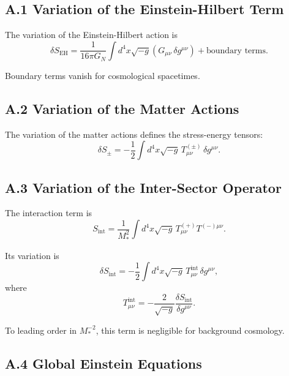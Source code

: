 \documentclass[11pt,a4paper]{article}
\begin{document}
\subsection*{A.1 Variation of the Einstein-Hilbert Term}

The variation of the Einstein-Hilbert action is
\begin{equation}
\delta S_{\mathrm{EH}} = \frac{1}{16\pi G_N} 
\int d^4x \sqrt{-g} \left( G_{\mu\nu} \, \delta g^{\mu\nu} \right)
+ \text{boundary terms}.
\end{equation}

Boundary terms vanish for cosmological spacetimes.

\subsection*{A.2 Variation of the Matter Actions}

The variation of the matter actions defines the stress-energy tensors:
\begin{equation}
\delta S_\pm = -\frac{1}{2} \int d^4x \sqrt{-g} \, 
T_{\mu\nu}^{(\pm)} \, \delta g^{\mu\nu}.
\end{equation}

\subsection*{A.3 Variation of the Inter-Sector Operator}

The interaction term is
\begin{equation}
S_{\mathrm{int}} = \frac{1}{M_*^2} 
\int d^4x \sqrt{-g} \, T^{(+)}_{\mu\nu} T^{(-)\mu\nu}.
\end{equation}

Its variation is
\begin{equation}
\delta S_{\mathrm{int}} = 
-\frac{1}{2} \int d^4x \sqrt{-g} \, 
T_{\mu\nu}^{\mathrm{int}} \, \delta g^{\mu\nu},
\end{equation}
where
\begin{equation}
T_{\mu\nu}^{\mathrm{int}} = 
-\frac{2}{\sqrt{-g}} \frac{\delta S_{\mathrm{int}}}{\delta g^{\mu\nu}}.
\end{equation}

To leading order in $M_*^{-2}$, this term is negligible for background cosmology.

\subsection*{A.4 Global Einstein Equations}
\end{document}

